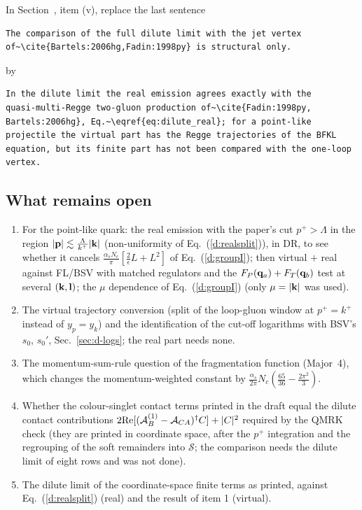 In Section~, item (v), replace the last sentence
\begin{verbatim}
The comparison of the full dilute limit with the jet vertex
of~\cite{Bartels:2006hg,Fadin:1998py} is structural only.
\end{verbatim}
by
\begin{verbatim}
In the dilute limit the real emission agrees exactly with the
quasi-multi-Regge two-gluon production of~\cite{Fadin:1998py,
Bartels:2006hg}, Eq.~\eqref{eq:dilute_real}; for a point-like
projectile the virtual part has the Regge trajectories of the BFKL
equation, but its finite part has not been compared with the one-loop
vertex.
\end{verbatim}

\subsection{What remains open}
\begin{enumerate}
\item For the point-like quark: the real emission with the paper's cut $p^+>\Lambda$ in the region $|\mathbf{p}|\lesssim\frac{\Lambda}{k^+}|\mathbf{k}|$ (non-uniformity of Eq.~(\ref{d:realsplit})), in DR, to see whether it cancels $\frac{\alpha_sN_c}{\pi}[\frac2\epsilon L+L^2]$ of Eq.~(\ref{d:groupI}); then virtual $+$ real against FL/BSV with matched regulators and the $F_P(\mathbf{q}_a)+F_T(\mathbf{q}_b)$ test at several $(\mathbf{k},\mathbf{l})$; the $\mu$ dependence of Eq.~(\ref{d:groupI}) (only $\mu=|\mathbf{k}|$ was used).
\item The virtual trajectory conversion (split of the loop-gluon window at $p^+=k^+$ instead of $y_p=y_k$) and the identification of the cut-off logarithms with BSV's $s_0$, $s_0'$, Sec.~\ref{sec:d-logs}; the real part needs none.
\item The momentum-sum-rule question of the fragmentation function (Major~4), which changes the momentum-weighted constant by $\frac{\alpha_s}{2\pi}N_c(\frac{65}{36}-\frac{2\pi^2}{3})$.
\item Whether the colour-singlet contact terms printed in the draft equal the dilute contact contributions $2{\rm Re}[(\mathcal A_B^{(1)}-\mathcal A_{CA})^\dagger C]+|C|^2$ required by the QMRK check (they are printed in coordinate space, after the $p^+$ integration and the regrouping of the soft remainders into $\mathcal S$; the comparison needs the dilute limit of eight rows and was not done).
\item The dilute limit of the coordinate-space finite terms as printed, against Eq.~(\ref{d:realsplit}) (real) and the result of item 1 (virtual).
\end{enumerate}
